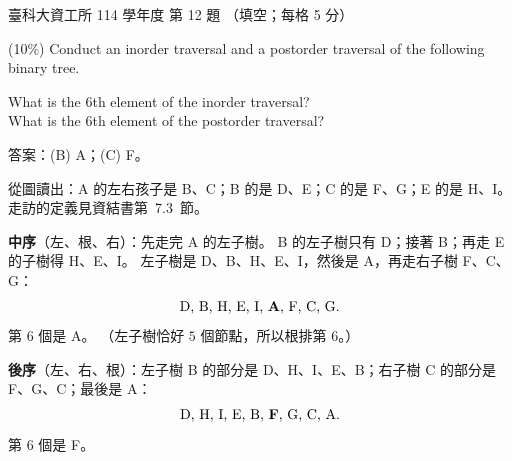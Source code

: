 \begin{pastexam}[label={px:ntust-114-ice-12}]{臺科大資工所 114 學年度 第 12 題}
（填空；每格 5 分）

(10\%) Conduct an inorder traversal and a postorder traversal of the following binary tree.

\begin{center}
\end{center}

What is the 6th element of the inorder traversal? \\
What is the 6th element of the postorder traversal? 
\end{pastexam}

\begin{pastsoln}
答案：(B) A；(C) F。

從圖讀出：A 的左右孩子是 B、C；B 的是 D、E；C 的是 F、G；E 的是 H、I。 走訪的定義見資結書第~7.3~節。

\textbf{中序}（左、根、右）：先走完 A 的左子樹。 B 的左子樹只有 D；接著 B；再走 E 的子樹得 H、E、I。
左子樹是 D、B、H、E、I，然後是 A，再走右子樹 F、C、G：
\[
\text{D, B, H, E, I, \textbf{A}, F, C, G}.
\]
第 $6$ 個是 A。 （左子樹恰好 $5$ 個節點，所以根排第 $6$。）

\textbf{後序}（左、右、根）：左子樹 B 的部分是 D、H、I、E、B；右子樹 C 的部分是 F、G、C；最後是 A：
\[
\text{D, H, I, E, B, \textbf{F}, G, C, A}.
\]
第 $6$ 個是 F。
\end{pastsoln}
